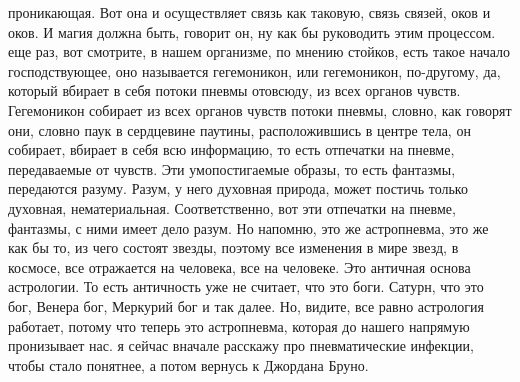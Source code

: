 проникающая. Вот она и осуществляет связь как таковую, связь связей, оков и
оков. И магия должна быть, говорит он, ну как бы руководить этим процессом. еще
раз, вот смотрите, в нашем организме, по мнению стойков, есть такое начало
господствующее, оно называется гегемоникон, или гегемоникон, по-другому, да,
который вбирает в себя потоки пневмы отовсюду, из всех органов чувств.
Гегемоникон собирает из всех органов чувств потоки пневмы, словно, как говорят
они, словно паук в сердцевине паутины, расположившись в центре тела, он
собирает, вбирает в себя всю информацию, то есть отпечатки на пневме,
передаваемые от чувств. Эти умопостигаемые образы, то есть фантазмы, передаются
разуму. Разум, у него духовная природа, может постичь только духовная,
нематериальная. Соответственно, вот эти отпечатки на пневме, фантазмы, с ними
имеет дело разум. Но напомню, это же астропневма, это же как бы то, из чего
состоят звезды, поэтому все изменения в мире звезд, в космосе, все отражается на
человека, все на человеке. Это античная основа астрологии. То есть античность
уже не считает, что это боги. Сатурн, что это бог, Венера бог, Меркурий бог и
так далее. Но, видите, все равно астрология работает, потому что теперь это
астропневма, которая до нашего напрямую пронизывает нас. я сейчас вначале
расскажу про пневматические инфекции, чтобы стало понятнее, а потом вернусь к
Джордана Бруно. 

